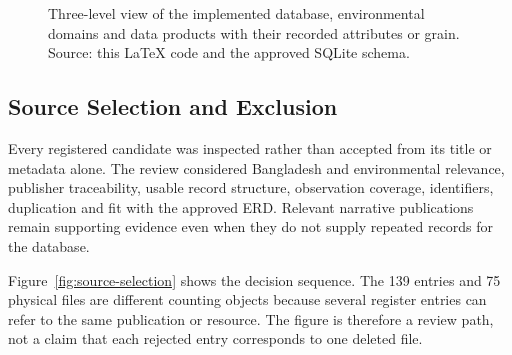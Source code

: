 \begin{figure}[H]
\caption{Three-level view of the implemented database, environmental domains
and data products with their recorded attributes or grain. Source: this LaTeX
code and the approved SQLite schema.}
\label{fig:environmental-categories}
\end{figure}

\subsection{Source Selection and Exclusion}
\label{subsec:source-selection-exclusion}

Every registered candidate was inspected rather than accepted from its title or
metadata alone. The review considered Bangladesh and environmental relevance,
publisher traceability, usable record structure, observation coverage,
identifiers, duplication and fit with the approved ERD. Relevant narrative
publications remain supporting evidence even when they do not supply repeated
records for the database.

{
Figure~\ref{fig:source-selection} shows the decision sequence. The 139 entries
and 75 physical files are different counting objects because several register
entries can refer to the same publication or resource. The figure is therefore
a review path, not a claim that each rejected entry corresponds to one deleted
file.\par}

